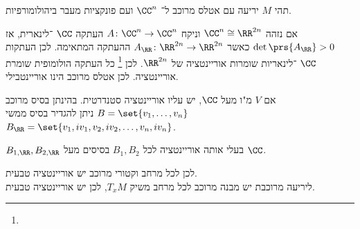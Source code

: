\documentclass[a4paper,10pt,twoside,openany]{book}
\begin{document}
\begin{example}
תהי
$M$
יריעה עם אטלס מרוכב ל־%
$\CC^n$
ועם פונקציות מעבר ביהולומורפיות.
\begin{exercise}
אם נזהה
$\CC^n \cong \RR^{2n}$
וניקח
$A \colon \CC^n \to \CC^n$
העתקה
$\CC$%
־לינארית, אז
$\det\prs{A_{\RR}} > 0$
כאשר
$A_{\RR} \colon \RR^{2n} \to \RR^{2n}$
ההעתקה המתאימה.
לכן העתקות
$\CC$%
־לינאריות שומרות אוריינטציה של
$\RR^{2n}$.
לכן%
\footnote{}
 כל העתקה הולומופית שומרת אוריינטציה.
לכן אטלס מרוכב הינו אוריינטבילי.
\end{exercise}
\end{example}
\begin{example}
אם
$V$
מ"ו מעל
$\CC$,
יש עליו אוריינטציה סטנדרטית.
בהינתן בסיס מרוכב
$B = \set{v_1, \ldots, v_n}$
ניתן להגדיר בסיס ממשי
$B_{\RR} = \set{v_1, iv_1, v_2, iv_2, \ldots, v_n, iv_n}$.
\begin{exercise}
$B_{1, \RR}, B_{2,\RR}$
בעלי אותה אוריינטציה לכל
$B_1, B_2$
בסיסים מעל
$\CC$.
\end{exercise}
לכן לכל מרחב וקטורי מרוכב יש אוריינטציה טבעית.
\\
ליריעה מרוכבת יש מבנה מרוכב לכל מרחב משיק
$T_x M$,
לכן יש אוריינטציה טבעית.
\end{example}

\backmatter
\end{document}
